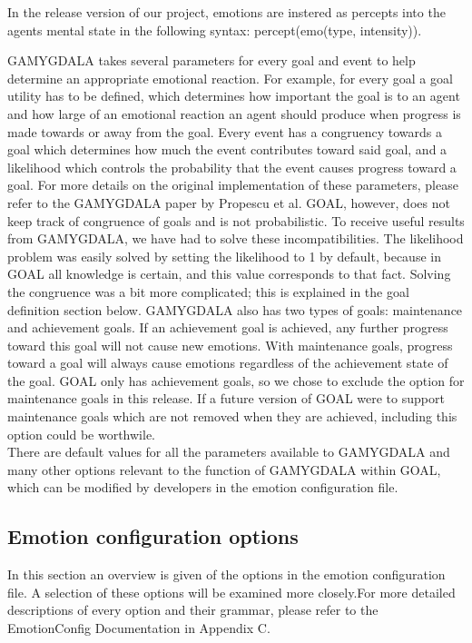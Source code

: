 \documentclass[11pt]{article}
\begin{document}
In the release version of our project, emotions are instered as percepts into the agents mental state in the following syntax: percept(emo(type, intensity)).

GAMYGDALA takes several parameters for every goal and event to help determine an appropriate emotional reaction. For example, for every goal a goal utility has to be defined, which determines how important the goal is to an agent and how large of an emotional reaction an agent should produce when progress is made towards or away from the goal. Every event has a congruency towards a goal which determines how much the event contributes toward said goal, and a likelihood which controls the probability that the event causes progress toward a goal. For more details on the original implementation of these parameters, please refer to the GAMYGDALA paper by Propescu et al.\cite{GAMYGDALA}
GOAL\cite{GOAL Env}, however, does not keep track of congruence of goals and is not probabilistic. To receive useful results from GAMYGDALA, we have had to solve these incompatibilities. The likelihood problem was easily solved by setting the likelihood to 1 by default, because in GOAL all knowledge is certain, and this value corresponds to that fact. Solving the congruence was a bit more complicated; this is explained in the goal definition section below.
GAMYGDALA also has two types of goals: maintenance and achievement goals. If an achievement goal is achieved, any further progress toward this goal will not cause new emotions. With maintenance goals, progress toward a goal will always cause emotions regardless of the achievement state of the goal. GOAL only has achievement goals, so we chose to exclude the option for maintenance goals in this release. If a future version of GOAL were to support maintenance goals which are not removed when they are achieved, including this option could be worthwile.\\
There are default values for all the parameters available to GAMYGDALA and many other options relevant to the function of GAMYGDALA within GOAL, which can be modified by developers in the emotion configuration file.


\subsection{Emotion configuration options}
In this section an overview is given of the options in the emotion configuration file. A selection of these options will be examined more closely.For more detailed descriptions of every option and their grammar, please refer to the EmotionConfig Documentation in Appendix C. 
\end{document}
